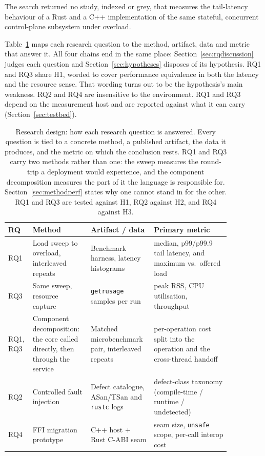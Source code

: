 \documentclass[english,twoside,openright,a4paper,censored,csm,software-track-2020]{HYthesisML}
\begin{document}
The search returned no study, indexed or grey, that measures the tail-latency behaviour of a
Rust and a C++ implementation of the same stateful, concurrent control-plane subsystem under
overload.

Table~\ref{tab:design} maps each research question to the method, artifact, data and metric that
answer it. All four chains end in the same place: Section~\ref{sec:rqdiscussion} judges each
question and Section~\ref{sec:hypotheses} disposes of its hypothesis. RQ1 and RQ3 share H1,
worded to cover performance equivalence in both the latency and the resource sense. That wording
turns out to be the hypothesis's main weakness. RQ2 and RQ4 are insensitive to the environment.
RQ1 and RQ3 depend on the measurement host and are reported against what it can carry
(Section~\ref{sec:testbed}).

\begin{table}[H]
\centering
\caption[Research design: how each research question is answered]{Research design: how each research question is answered. Every question is tied to a
concrete method, a published artifact, the data it produces, and the metric on which the
conclusion rests. RQ1 and RQ3 carry two methods rather than one: the sweep measures the
round-trip a deployment would experience, and the component decomposition measures the part of
it the language is responsible for. Section~\ref{sec:methodperf} states why one cannot stand in
for the other. RQ1 and RQ3 are tested against H1, RQ2 against H2, and RQ4 against
H3.\label{tab:design}}
\renewcommand{\arraystretch}{1.25}
\begin{tabular}{@{}p{0.06\linewidth} p{0.24\linewidth} p{0.24\linewidth} p{0.32\linewidth}@{}}
\hline\hline
RQ & Method & Artifact / data & Primary metric \\
\hline
RQ1 & Load sweep to overload, interleaved repeats & Benchmark harness, latency histograms &
median, p99/p99.9 tail latency, and maximum vs.\ offered load \\
RQ3 & Same sweep, resource capture & \texttt{getrusage} samples per run &
peak RSS, CPU utilisation, throughput \\
RQ1, RQ3 & Component decomposition: the core called directly, then through the service &
Matched microbenchmark pair, interleaved repeats &
per-operation cost split into the operation and the cross-thread handoff \\
RQ2 & Controlled fault injection & Defect catalogue, ASan/TSan and \texttt{rustc} logs &
defect-class taxonomy (compile-time / runtime / undetected) \\
RQ4 & FFI migration prototype & C++ host $+$ Rust C-ABI seam &
seam size, \texttt{unsafe} scope, per-call interop cost \\
\hline
\end{tabular}
\end{table}
\end{document}

